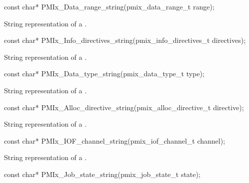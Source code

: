 \cspecificstart
\begin{codepar}
const char*
PMIx_Data_range_string(pmix_data_range_t range);
\end{codepar}
\cspecificend

\summary
{}

String representation of a .

\cspecificstart
\begin{codepar}
const char*
PMIx_Info_directives_string(pmix_info_directives_t directives);
\end{codepar}
\cspecificend

\summary
{}

String representation of a .

\cspecificstart
\begin{codepar}
const char*
PMIx_Data_type_string(pmix_data_type_t type);
\end{codepar}
\cspecificend

\summary
{}

String representation of a .

\cspecificstart
\begin{codepar}
const char*
PMIx_Alloc_directive_string(pmix_alloc_directive_t directive);
\end{codepar}
\cspecificend

\summary
{}

String representation of a .

\cspecificstart
\begin{codepar}
const char*
PMIx_IOF_channel_string(pmix_iof_channel_t channel);
\end{codepar}
\cspecificend

\summary
{}

String representation of a .

\cspecificstart
\begin{codepar}
const char*
PMIx_Job_state_string(pmix_job_state_t state);
\end{codepar}
\cspecificend

\summary
{}

